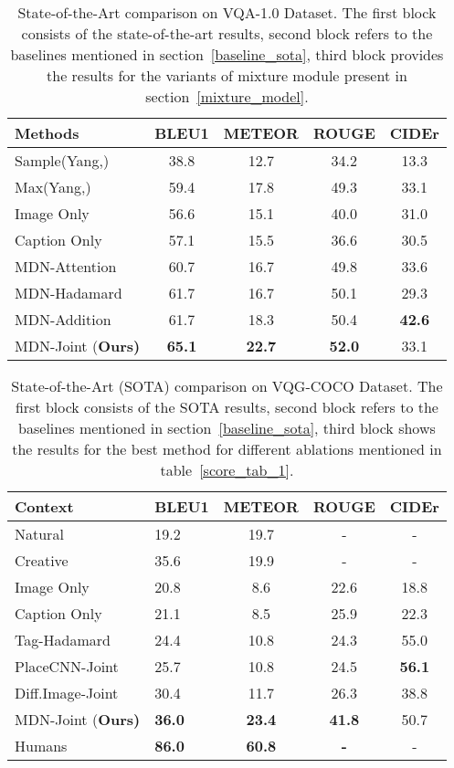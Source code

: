 \documentclass[11pt,a4paper]{article}
\begin{document}
\begin{table}[ht]
\scriptsize
\centering
\begin{tabular}{|l|cccc|}
\hline \bf Methods & \bf BLEU1  & \bf METEOR & \bf ROUGE &  \bf CIDEr \\ \hline
Sample(Yang,\citeyear{Yang_arXiv2015}) & 38.8  & 12.7 & 34.2 & 13.3 \\
Max(Yang,\citeyear{Yang_arXiv2015}) &  59.4  & 17.8 & 49.3 & 33.1\\ \hline
Image Only & 56.6  & 15.1  & 40.0 & 31.0\\
Caption Only & 57.1  & 15.5  & 36.6 & 30.5\\ \hline
MDN-Attention   & 60.7  & 16.7  & 49.8 & 33.6\\
MDN-Hadamard  & 61.7 & 16.7  & 50.1 & 29.3 \\
MDN-Addition  & 61.7  & 18.3  & 50.4 & \textbf{42.6} \\
MDN-Joint (\bf Ours)& \textbf{65.1}  & \textbf{22.7}  & \textbf{52.0} & 33.1\\
\hline
\end{tabular}
\caption{\label{score_tab_2}State-of-the-Art comparison on VQA-1.0 Dataset. The first block consists of the state-of-the-art results, second block refers to the baselines mentioned in section~\ref{baseline_sota}, third block provides the results for the variants of mixture module present in section~\ref{mixture_model}.}
\end{table}
\begin{table}[ht]
\scriptsize
\centering
\begin{tabular}{|l|lccc|}
\hline \bf Context &  \bf BLEU1 & \bf METEOR & \bf ROUGE & \bf CIDEr \\ \hline 

Natural\citeyear{mostafazadeh2016generating} & 19.2 & 19.7  &- & -  \\
Creative\citeyear{jain2017creativity} & {35.6} & 19.9 & - & - \\ \hline
Image Only &  20.8  &  8.6  & 22.6 & 18.8\\
Caption Only & 21.1 & 8.5  & 25.9 & 22.3\\\hline
Tag-Hadamard & {24.4} &{10.8}& {24.3} & {55.0}\\ 
PlaceCNN-Joint & {25.7}  &{10.8}&{24.5} &\textbf{56.1} \\
Diff.Image-Joint& 30.4 & {11.7} & 26.3 & {38.8}\\
MDN-Joint (\bf Ours)& \textbf{36.0}&\textbf{23.4}&\textbf{41.8}& 50.7\\\hline
Humans\citeyear{mostafazadeh2016generating} & \textbf{86.0}&\textbf{60.8}&\textbf{-}& -\\\hline
\end{tabular}
\caption{\label{score_tab_3}State-of-the-Art (SOTA) comparison on VQG-COCO Dataset. The first block consists of the SOTA results, second block refers to the baselines mentioned in section~\ref{baseline_sota}, third block shows the results for the best method for different ablations mentioned in table~\ref{score_tab_1}. }
\end{table}
\end{document}
